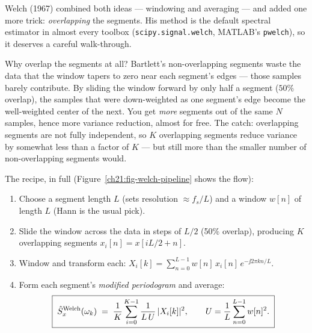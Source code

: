 Welch (1967) combined both ideas --- windowing and averaging --- and added one more
trick: \emph{overlapping} the segments. His method is the default spectral
estimator in almost every toolbox (\texttt{scipy.signal.welch},
MATLAB's \texttt{pwelch}), so it deserves a careful walk-through.

\begin{walkbox}
Why overlap the segments at all? Bartlett's non-overlapping segments waste the
data that the window tapers to zero near each segment's edges --- those samples
barely contribute. By sliding the window forward by only half a segment ($50\%$
overlap), the samples that were down-weighted as one segment's edge become the
well-weighted center of the next. You get \emph{more} segments out of the same $N$
samples, hence more variance reduction, almost for free. The catch: overlapping
segments are not fully independent, so $K$ overlapping segments reduce variance by
somewhat less than a factor of $K$ --- but still more than the smaller number of
non-overlapping segments would.
\end{walkbox}

The recipe, in full (Figure~\ref{ch21:fig-welch-pipeline} shows the flow):

\begin{enumerate}
\item Choose a segment length $L$ (sets resolution $\approx f_s/L$) and a window
$w[n]$ of length $L$ (Hann is the usual pick).
\item Slide the window across the data in steps of $L/2$ (50\% overlap), producing
$K$ overlapping segments $x_i[n] = x[iL/2 + n]$.
\item Window and transform each: $X_i[k] = \sum_{n=0}^{L-1} w[n]\,x_i[n]\,e^{-\jj
2\pi kn/L}$.
\item Form each segment's \emph{modified periodogram} and average:
\[
\boxed{\;\hat{S}^{\text{Welch}}_x(\omega_k) \;=\; \frac{1}{K}\sum_{i=0}^{K-1}
\frac{1}{L\,U}\,\lvert X_i[k]\rvert^2, \qquad U=\frac{1}{L}\sum_{n=0}^{L-1} w[n]^2.\;}
\]
\end{enumerate}

